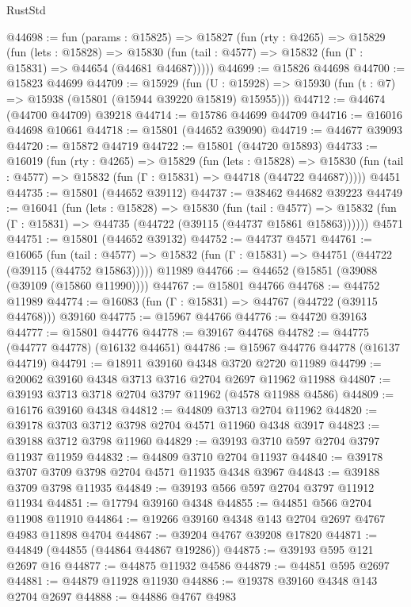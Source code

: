 \begin{lexlean}{RustStd}
\begin{coremodule}
@44698 := fun (params : @15825) =>
  @15827
    (fun (rty : @4265) =>
    @15829
      (fun (lets : @15828) =>
      @15830 (fun (tail : @4577) => @15832 (fun (Γ : @15831) => @44654 (@44681 @44687)))))
@44699 := @15826 @44698
@44700 := @15823 @44699
@44709 := @15929
    (fun (U : @15928) => @15930 (fun (t : @7) => @15938 (@15801 (@15944 @39220 @15819) @15955)))
@44712 := @44674 (@44700 @44709) @39218
@44714 := @15786 @44699 @44709
@44716 := @16016 @44698 @10661
@44718 := @15801 (@44652 @39090)
@44719 := @44677 @39093
@44720 := @15872 @44719
@44722 := @15801 (@44720 @15893)
@44733 := @16019
    (fun (rty : @4265) =>
    @15829
      (fun (lets : @15828) =>
      @15830 (fun (tail : @4577) => @15832 (fun (Γ : @15831) => @44718 (@44722 @44687)))))
    @4451
@44735 := @15801 (@44652 @39112)
@44737 := @38462 @44682 @39223
@44749 := @16041
    (fun (lets : @15828) =>
    @15830
      (fun (tail : @4577) =>
      @15832 (fun (Γ : @15831) => @44735 (@44722 (@39115 (@44737 @15861 @15863))))))
    @4571
@44751 := @15801 (@44652 @39132)
@44752 := @44737 @4571
@44761 := @16065
    (fun (tail : @4577) => @15832 (fun (Γ : @15831) => @44751 (@44722 (@39115 (@44752 @15863)))))
    @11989
@44766 := @44652 (@15851 (@39088 (@39109 (@15860 @11990))))
@44767 := @15801 @44766
@44768 := @44752 @11989
@44774 := @16083 (fun (Γ : @15831) => @44767 (@44722 (@39115 @44768))) @39160
@44775 := @15967 @44766
@44776 := @44720 @39163
@44777 := @15801 @44776
@44778 := @39167 @44768
@44782 := @44775 (@44777 @44778) (@16132 @44651)
@44786 := @15967 @44776 @44778 (@16137 @44719)
@44791 := @18911 @39160 @4348 @3720 @2720 @11989
@44799 := @20062 @39160 @4348 @3713 @3716 @2704 @2697 @11962 @11988
@44807 := @39193 @3713 @3718 @2704 @3797 @11962 (@4578 @11988 @4586)
@44809 := @16176 @39160 @4348
@44812 := @44809 @3713 @2704 @11962
@44820 := @39178 @3703 @3712 @3798 @2704 @4571 @11960 @4348 @3917
@44823 := @39188 @3712 @3798 @11960
@44829 := @39193 @3710 @597 @2704 @3797 @11937 @11959
@44832 := @44809 @3710 @2704 @11937
@44840 := @39178 @3707 @3709 @3798 @2704 @4571 @11935 @4348 @3967
@44843 := @39188 @3709 @3798 @11935
@44849 := @39193 @566 @597 @2704 @3797 @11912 @11934
@44851 := @17794 @39160 @4348
@44855 := @44851 @566 @2704 @11908 @11910
@44864 := @19266 @39160 @4348 @143 @2704 @2697 @4767 @4983 @11898 @4704
@44867 := @39204 @4767 @39208 @17820
@44871 := @44849 (@44855 (@44864 @44867 @19286))
@44875 := @39193 @595 @121 @2697 @16
@44877 := @44875 @11932 @4586
@44879 := @44851 @595 @2697
@44881 := @44879 @11928 @11930
@44886 := @19378 @39160 @4348 @143 @2704 @2697
@44888 := @44886 @4767 @4983

\end{coremodule}
\end{lexlean}
